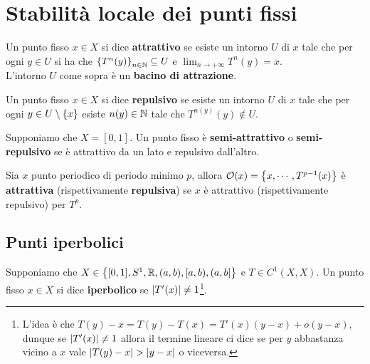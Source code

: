 \chapter{Stabilit\`a locale dei punti fissi}
\begin{definition}
Un punto fisso $x\in X$ si dice \textbf{attrattivo} se esiste un intorno $U$ di $x$ tale che per ogni $y\in U$ si ha che $\left\{{T^n(y)}\right\}_{n\in\mathbb{N}}\subseteq U$ e $\displaystyle\lim_{n\to+\infty}T^n(y)=x$.\\
L'intorno $U$ come sopra \`e un \textbf{bacino di attrazione}.
\vspace{0.25cm}

\noindent
Un punto fisso $x\in X$ si dice \textbf{repulsivo} se esiste un intorno $U$ di $x$ tale che per ogni $y\in U\setminus \left\{{x}\right\}$ esiste $n(y)\in\mathbb{N}$ tale che $T^{n(y)}(y)\notin U$.
\end{definition}

\begin{definition}
Supponiamo che $X=[0,1]$. Un punto fisso \`e \textbf{semi-attrattivo} o \textbf{semi-repulsivo} se \`e attrattivo da un lato e repulsivo dall'altro.
\end{definition}

\begin{definition}
Sia $x$ punto periodico di periodo minimo $p$, allora $\mathcal{O}(x)=\left\{{x,\cdots, T^{p-1}(x)}\right\}$ \`e \textbf{attrattiva} (rispettivamente \textbf{repulsiva}) se $x$ \`e attrattivo (rispettivamente repulsivo) per $T^p$.
\end{definition}

\section{Punti iperbolici}
\begin{definition}
Supponiamo che $X\in\left\{{[0,1], S^1, \mathbb{R}, (a,b), [a,b), (a,b]}\right\}$ e $T\in C^1(X,X)$. Un punto fisso $x\in X$ si dice \textbf{iperbolico} se $\left|{T'(x)}\right|\neq 1$\footnote{L'idea \`e che $T(y)-x=T(y)-T(x)=T'(x)(y-x)+o(y-x)$, dunque se $\left|{T'(x)}\right|\neq 1$ allora il termine lineare ci dice se per $y$ abbastanza vicino a $x$ vale $\abs{T(y)-x}>\abs{y-x}$ o viceversa.}.
\end{definition}

